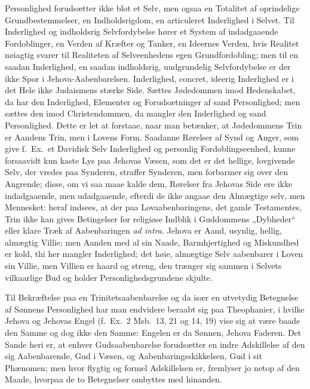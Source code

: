 \documentclass[12pt]{book}
\begin{document}
Personlighed forudsætter ikke blot et Selv, men ogsaa en Totalitet
af oprindelige Grundbestemmelser, en Indholdsrigdom, en articuleret
Inderlighed i Selvet. Til Inderlighed og indholdsrig Selvfordybelse
hører et System
af indadgaaende Fordoblinger, en Verden af Kræfter og Tanker, en
Ideernes Verden, hvis Realitet nøiagtig svarer til Realiteten af
Selveenhedens egen Grundfordobling; men til en saadan Inderlighed,
en saadan indholdsrig, uudgrundelig Selvfordybelse er der ikke Spor
i Jehova-Aabenbarelsen. Inderlighed, concret, ideerig Inderlighed er
i det Hele ikke Judaismens stærke Side. Sættes Jødedommen imod
Hedenskabet, da har den Inderlighed, Elementer og Forudsætninger af
sand Personlighed; men sættes den imod Christendommen, da mangler
den Inderlighed og sand Personlighed. Dette er let at forstaae,
naar man betænker, at Jødedommens Trin er Aandens Trin, men i Lovens
Form. Saadanne Rørelser af Synd og Anger, som give f.\ Ex.\ et
Davidisk Selv Inderlighed og personlig Fordoblingseenhed, kunne
forsaavidt kun kaste Lys paa Jehovas Væsen, som det er det hellige,
lovgivende Selv, der vredes paa Synderen, straffer Synderen, men
forbarmer sig over den Angrende; disse, om vi saa maae kalde dem,
Rørelser fra Jehovas Side ere ikke indadgaaende, men udadgaaende,
efterdi de ikke angaae den Almægtige selv, men Mennesket: heraf
indsees, at der paa Lovaabenbaringens, det gamle Testamentes, Trin
ikke kan gives Betingelser for religiøse Indblik i Guddommens
„Dybheder“ eller klare Træk af Aabenbaringen \textit{ad intra}.
Jehova er Aand, usynlig, hellig, almægtig Villie; men Aanden med al
sin Naade, Barmhjertighed og Miskundhed er kold, thi her mangler
Inderlighed; det høie, almægtige Selv aabenbarer i Loven sin Villie,
men Villien er haard og streng, den trænger sig sammen i Selvets
vilkaarlige Bud og holder Personlighedsgrundene skjulte.

Til Bekræftelse paa en Trinitetsaabenbarelse og da især en
utvetydig Betegnelse af Sønnens Personlighed har man endvidere
beraabt sig paa Theophanier, i hvilke Jehova og Jehovas Engel
(f.\ Ex.\ 2 Msb.\ 13, 21 og 14, 19)
vise sig at være baade den Samme og dog ikke den Samme: Engelen er
da Sønnen, Jehova Faderen. Det Sande heri er, at enhver
Gudsaabenbarelse forudsætter en indre Adskillelse af den sig
Aabenbarende, Gud i Væsen, og Aabenbaringsskikkelsen, Gud i sit
Phænomen; men hvor flygtig og formel Adskillelsen er, fremlyser jo
netop af den Maade, hvorpaa de to Betegnelser ombyttes med hinanden.
\end{document}
